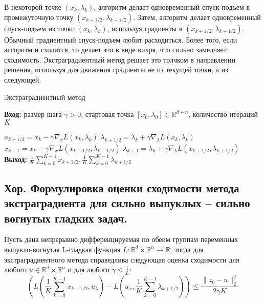 В некоторой точке $(x_k, \lambda_k)$, алгоритм делает одновременный спуск-подъем в промежуточную точку
$(x_{k+1/2}, \lambda_{k+1/2})$. Затем, алгоритм делает одновременный спуск-подъем из точки $(x_k, \lambda_k)$,
используя градиенты в $(x_{k+1/2}, \lambda_{k+1/2})$. Обычный градиентный спуск-подъем любит расходиться.
Более того, если алгоритм и сходится, то делает это в виде вихря, что сильно замедляет сходимость.
Экстраградиентный метод решает это толчком в направлении решения, используя для движения градиенты не из текущей точки,
а из следующей.

\begin{algorithm}[H]
    \caption{Экстраградиентный метод}
    \textbf{Вход:} размер шага $\gamma > 0$, стартовая точка $[x_0, \lambda_0] \in \mathbb{R}^{d+n}$, количество итераций $K$
    \begin{algorithmic}[1]
        \State $x_{k+1/2} = x_k - \gamma \nabla_x L(x_k, \lambda_k)$
        \State $\lambda_{k+1/2} = \lambda_k + \gamma \nabla_\lambda L(x_k, \lambda_k)$
        \State $x_{k+1} = x_k - \gamma \nabla_x L(x_{k+1/2}, \lambda_{k+1/2})$
        \State $\lambda_{k+1} = \lambda_k + \gamma \nabla_\lambda L(x_{k+1/2}, \lambda_{k+1/2})$
        \EndFor
        \State \textbf{Выход:} $\frac{1}{K} \sum_{k=0}^{K-1} x_{k+1/2}, \frac{1}{K} \sum_{k=0}^{K-1} \lambda_{k+1/2}$
    \end{algorithmic}
\end{algorithm}


\subsection{Хор. Формулировка оценки сходимости метода экстраградиента для сильно выпуклых –
    сильно вогнутых гладких задач.}

\begin{theorem}
    Пусть дана непрерывно дифференцируемая по обеим группам переменных выпукло-вогнутая L-гладкая функция
    $L : \mathbb{R}^d \times \mathbb{R}^n \to \mathbb{R}$,
    тогда для экстраградиентного метода справедлива следующая оценка сходимости для любого
    $u \in \mathbb{R}^d \times \mathbb{R}^n$ и для любого $\gamma \leq \frac{1}{L}$:
    $$\left( L \left( \frac{1}{K} \sum_{k=0}^{K-1} x_{k+1/2}, u_\lambda \right) - L \left( u_x, \frac{1}{K} \sum_{k=0}^{K-1} \lambda_{k+1/2} \right) \right) \leq \frac{\|z_0 - u\|_2^2}{2\gamma K}$$
\end{theorem}

